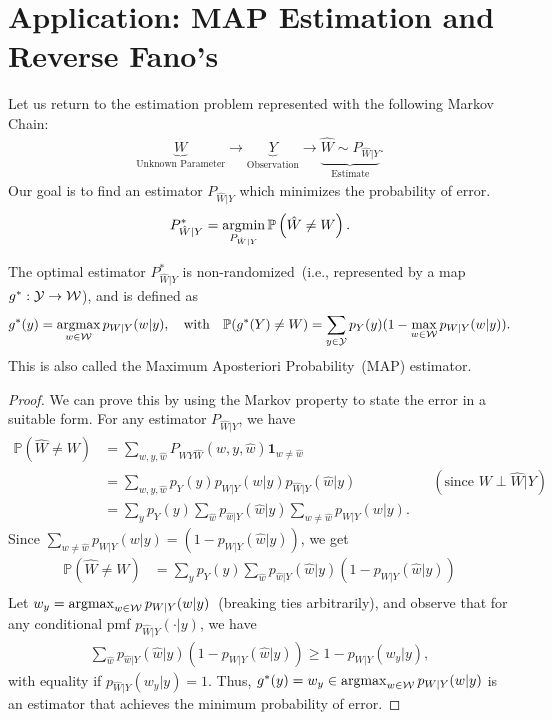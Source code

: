 \documentclass[12pt]{article}
\begin{document}
\section{Application: MAP Estimation and Reverse Fano's}
Let us return to the estimation problem represented with the following Markov Chain: 
\begin{align}
\underbrace{W}_{\text{Unknown Parameter}} \rightarrow \underbrace{Y}_{\text{Observation}} \rightarrow \underbrace{\hat{W} \sim P_{\hat{W}|Y}}_{\text{Estimate}}. 
\end{align}
Our goal is to find an estimator $P_{\hat{W}|Y}$ which minimizes the probability of error.  
\begin{align}
	P^*_{\hat{W}|Y} = \operatorname*{argmin}_{P_{\hat{W}|Y}} \mathbb{P}\left( \hat{W} \neq W\right). 
\end{align}
\begin{proposition}
\label{prop:MAP-estimation} The optimal estimator $P^*_{\hat{W}|Y}$ is non-randomized~(i.e., represented by a map $g^*:{\cal Y} \to {\cal W}$), and is defined as 
\begin{align}
g^*(y) = \operatorname*{argmax}_{w \in {\cal W}} p_{W|Y}(w|y),\quad \text{with} \quad \mathbb{P}(g^*(Y) \neq W) =  \sum_{y \in {\cal Y}} p_Y(y) (1 - \max_{w \in {\cal W}} p_{W|Y}(w|y)). 
 \label{eq:map-estimator-def}
\end{align}
This is also called the Maximum Aposteriori Probability~(MAP) estimator. 
\end{proposition}
\begin{proof}
We can prove this by using the Markov property to state the error in a suitable form. For any estimator $P_{\hat{W}|Y}$, we have  
\begin{align}
\mathbb{P}(\hat{W} \neq W) &= \sum_{w, y, \hat{w}} P_{WY\hat{W}}(w, y, \hat{w}) \boldsymbol{1}_{w \neq \hat{w}} && \\
& = \sum_{w, y, \hat{w}} p_Y(y) p_{W|Y}(w|y) p_{\hat{W}|Y} (\hat{w}|y) && (\text{since }W \perp \hat{W}|Y) \\
& = \sum_{y} p_Y(y) \sum_{\hat{w}} p_{\hat{w}|Y}(\hat{w}|y) \sum_{w \neq \hat{w}} p_{W|Y}(w|y). 
\end{align}
Since $\sum_{w \neq \hat{w}} p_{W|Y}(w|y) = (1- p_{W|Y}(\hat{w}|y))$, we get 
\begin{align}
\mathbb{P}(\hat{W} \neq W)& = \sum_{y} p_Y(y) \sum_{\hat{w}} p_{\hat{w}|Y}(\hat{w}|y) (1- p_{W|Y}(\hat{w}|y)) \\
\end{align}
Let $w_y = \operatorname*{argmax}_{w \in {\cal W}} p_{W|Y}(w|y)$~(breaking ties arbitrarily), and observe that for any conditional pmf $p_{\hat{W}|Y}(\cdot |y)$, we have 
\begin{align}
\sum_{\hat{w}} p_{\hat{w}|Y}(\hat{w}|y) (1- p_{W|Y}(\hat{w}|y)) \geq 1 - p_{W|Y}(w_y|y), 
\end{align}
with equality if $p_{\hat{W}|Y}(w_y|y) = 1$. Thus, $g^*(y) = w_y \in \operatorname*{argmax}_{w \in {\cal W}} p_{W|Y}(w|y)$ is an estimator that achieves the minimum probability of error. 
\end{proof}
\end{document}
